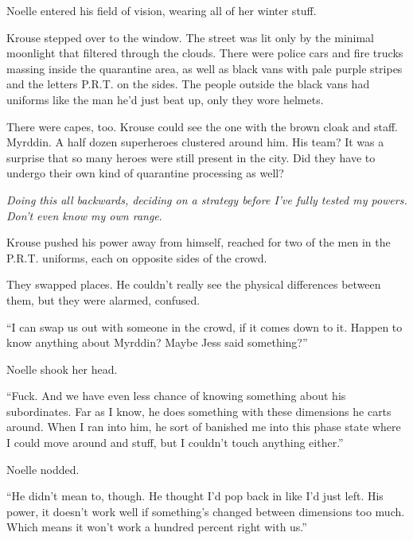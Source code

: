 Noelle entered his field of vision, wearing all of her winter stuff.



Krouse stepped over to the window.  The street was lit only by the minimal moonlight that filtered through the clouds.  There were police cars and fire trucks massing inside the quarantine area, as well as black vans with pale purple stripes and the letters P.R.T. on the sides.  The people outside the black vans had uniforms like the man he'd just beat up, only they wore helmets.



There were capes, too.  Krouse could see the one with the brown cloak and staff.  Myrddin.  A half dozen superheroes clustered around him.  His team?  It was a surprise that so many heroes were still present in the city.  Did they have to undergo their own kind of quarantine processing as well?



\emph{Doing this all backwards, deciding on a strategy before I've fully tested my powers.  Don't even know my own range}.



Krouse pushed his power away from himself, reached for two of the men in the P.R.T. uniforms, each on opposite sides of the crowd.



They swapped places.  He couldn't really see the physical differences between them, but they were alarmed, confused.



``I can swap us out with someone in the crowd, if it comes down to it.  Happen to know anything about Myrddin?  Maybe Jess said something?''



Noelle shook her head.



``Fuck.  And we have even less chance of knowing something about his subordinates.  Far as I know, he does something with these dimensions he carts around.  When I ran into him, he sort of banished me into this phase state where I could move around and stuff, but I couldn't touch anything either.''



Noelle nodded.



``He didn't mean to, though.  He thought I'd pop back in like I'd just left.  His power, it doesn't work well if something's changed between dimensions too much.  Which means it won't work a hundred percent right with us.''



